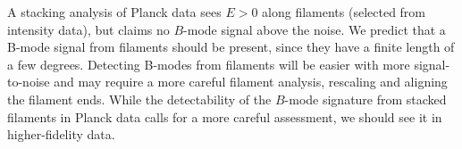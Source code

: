 A stacking analysis of Planck data \citep{2016A&A...586A.141P} sees $E>0$ along filaments (selected from intensity data), but claims no $B$-mode signal above the noise. We predict that a B-mode signal from filaments should be present, since they have a finite length of a few degrees.  Detecting B-modes from filaments will be easier with more signal-to-noise and may require a more careful filament analysis, rescaling and aligning the filament ends.  While the detectability of the $B$-mode signature from stacked filaments in Planck data calls for a more careful assessment, we should see it in higher-fidelity data. 

